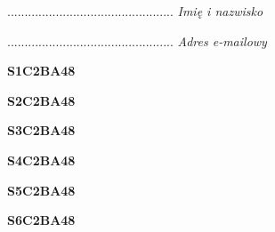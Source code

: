 \begin{turn}{90}\begin{minipage}{\linewidth} \vspace{20mm} ................................................  \textit{Imię i nazwisko}\end{minipage}\end{turn}

\begin{turn}{90}\begin{minipage}{\linewidth} \vspace{20mm} ................................................  \textit{Adres e-mailowy}\end{minipage}\end{turn}

\begin{turn}{90}\huge \begin{minipage}{\linewidth} \vspace{10mm}\textbf{S1C2BA48}\end{minipage}\end{turn}

\begin{turn}{90}\huge \begin{minipage}{\linewidth} \vspace{10mm}\textbf{S2C2BA48}\end{minipage}\end{turn}

\begin{turn}{90}\huge \begin{minipage}{\linewidth} \vspace{10mm}\textbf{S3C2BA48}\end{minipage}\end{turn}

\begin{turn}{90}\huge \begin{minipage}{\linewidth} \vspace{10mm}\textbf{S4C2BA48}\end{minipage}\end{turn}

\begin{turn}{90}\huge \begin{minipage}{\linewidth} \vspace{10mm}\textbf{S5C2BA48}\end{minipage}\end{turn}

\begin{turn}{90}\huge \begin{minipage}{\linewidth} \vspace{10mm}\textbf{S6C2BA48}\end{minipage}\end{turn}

